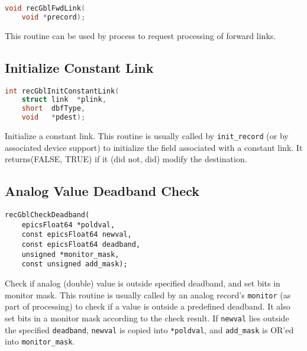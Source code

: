 \begin{lstlisting}[language=C]
void recGblFwdLink(
    void *precord);
\end{lstlisting}

This routine can be used by process to request processing of forward links.

\subsection{Initialize Constant Link}

\begin{lstlisting}[language=C]
int recGblInitConstantLink(
    struct link  *plink,
    short  dbfType,
    void   *pdest);
\end{lstlisting}

Initialize a constant link.
This routine is usually called by \verb|init_record| (or by associated device support) to initialize the field associated with a constant link.
It returns(FALSE, TRUE) if it (did not, did) modify the destination.

\subsection{Analog Value Deadband Check}

\begin{verbatim}
recGblCheckDeadband(
    epicsFloat64 *poldval,
    const epicsFloat64 newval,
    const epicsFloat64 deadband,
    unsigned *monitor_mask,
    const unsigned add_mask);
\end{verbatim}

Check if analog (double) value is outside specified deadband, and set bits in monitor mask.
This routine is usually called by an analog record's \verb|monitor| (as part of processing) to check if a value is outside a predefined deadband.
It also set bits in a monitor mask according to the check result.
If \verb|newval| lies outside the specified \verb|deadband|, \verb|newval| is copied into \verb|*poldval|, and \verb|add_mask| is OR'ed into \verb|monitor_mask|.
